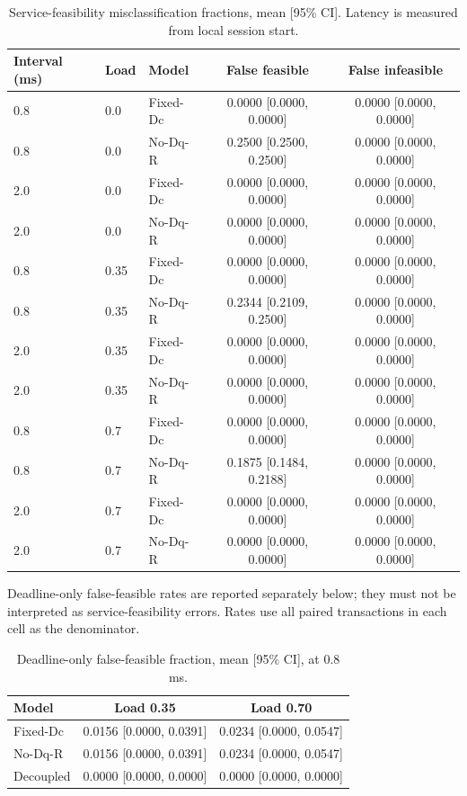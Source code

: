 \begin{table}[t]
\centering
\caption{Service-feasibility misclassification fractions, mean [95\% CI]. Latency is measured from local session start.}
\begin{tabular}{lllcc}
\hline
Interval (ms) & Load & Model & False feasible & False infeasible \\
\hline
0.8 & 0.0 & Fixed-Dc & 0.0000 [0.0000, 0.0000] & 0.0000 [0.0000, 0.0000] \\
0.8 & 0.0 & No-Dq-R & 0.2500 [0.2500, 0.2500] & 0.0000 [0.0000, 0.0000] \\
2.0 & 0.0 & Fixed-Dc & 0.0000 [0.0000, 0.0000] & 0.0000 [0.0000, 0.0000] \\
2.0 & 0.0 & No-Dq-R & 0.0000 [0.0000, 0.0000] & 0.0000 [0.0000, 0.0000] \\
0.8 & 0.35 & Fixed-Dc & 0.0000 [0.0000, 0.0000] & 0.0000 [0.0000, 0.0000] \\
0.8 & 0.35 & No-Dq-R & 0.2344 [0.2109, 0.2500] & 0.0000 [0.0000, 0.0000] \\
2.0 & 0.35 & Fixed-Dc & 0.0000 [0.0000, 0.0000] & 0.0000 [0.0000, 0.0000] \\
2.0 & 0.35 & No-Dq-R & 0.0000 [0.0000, 0.0000] & 0.0000 [0.0000, 0.0000] \\
0.8 & 0.7 & Fixed-Dc & 0.0000 [0.0000, 0.0000] & 0.0000 [0.0000, 0.0000] \\
0.8 & 0.7 & No-Dq-R & 0.1875 [0.1484, 0.2188] & 0.0000 [0.0000, 0.0000] \\
2.0 & 0.7 & Fixed-Dc & 0.0000 [0.0000, 0.0000] & 0.0000 [0.0000, 0.0000] \\
2.0 & 0.7 & No-Dq-R & 0.0000 [0.0000, 0.0000] & 0.0000 [0.0000, 0.0000] \\
\hline
\end{tabular}
\end{table}

Deadline-only false-feasible rates are reported separately below; they must not be interpreted as service-feasibility errors. Rates use all paired transactions in each cell as the denominator.

\begin{table}[t]
\centering
\caption{Deadline-only false-feasible fraction, mean [95\% CI], at 0.8 ms.}
\begin{tabular}{lcc}
\hline
Model & Load 0.35 & Load 0.70 \\
\hline
Fixed-Dc & 0.0156 [0.0000, 0.0391] & 0.0234 [0.0000, 0.0547] \\
No-Dq-R & 0.0156 [0.0000, 0.0391] & 0.0234 [0.0000, 0.0547] \\
Decoupled & 0.0000 [0.0000, 0.0000] & 0.0000 [0.0000, 0.0000] \\
\hline
\end{tabular}
\end{table}
